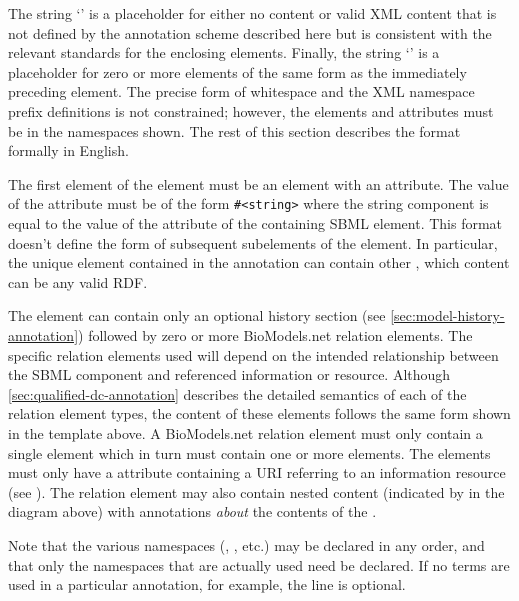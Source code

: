 The string
`\otherContent' is a placeholder for either no content or valid
XML content that is not defined by the annotation scheme described
here but is consistent with the relevant standards for the
enclosing elements.  Finally, the string `\moreOfTheSame' is a
placeholder for zero or more elements of the same form as the
immediately preceding element.  The precise form of whitespace and
the XML namespace prefix definitions is not constrained; however,
the elements and attributes must be in the namespaces shown. The
rest of this section describes the format formally in English.

The first element of the  element must be an
 element with an 
attribute. The value of the
 attribute must be of the form
\texttt{\#<string>} where the string component is equal to the
value of the  attribute of the containing SBML element.
This format doesn't define the form of subsequent
subelements of the  element. In particular, the unique  element contained in the annotation can contain other , which content can be any valid RDF.

The  element can contain only an optional
history section (see \ref{sec:model-history-annotation})
followed by zero or more BioModels.net relation elements.  The
specific relation elements used will depend on the intended
relationship between the SBML component and referenced information
or resource.  Although \ref{sec:qualified-dc-annotation}
describes the detailed semantics of each of the relation element
types, the content of these elements follows the same form shown
in the template above.  A BioModels.net relation element must only
contain a single  element which in turn must 
contain one or more  elements.  The 
elements must only have a  attribute
containing a URI referring to an information resource (see
).  The relation element may also contain nested content (indicated by \nestedContent in the diagram above) with annotations \emph{about} the contents of the .

Note that the various namespaces (, , etc.) may be declared in any order, and that only the namespaces that are actually used need be declared.  If no  terms are used in a particular annotation, for example, the line  is optional.

